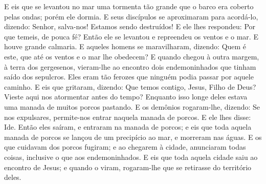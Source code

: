 {  E eis que se levantou no mar uma tormenta tão grande que o barco era coberto pelas ondas; porém ele dormia.
  E seus discípulos se aproximaram para acordá-lo, dizendo: Senhor, salva-nos! Estamos sendo destruídos!
  E ele lhes respondeu: Por que temeis,
{} de pouca fé? Então ele se levantou e repreendeu os ventos e o mar. E houve grande calmaria.
  E aqueles homens se maravilharam, dizendo: Quem é este, que até os ventos e o mar lhe obedecem?
  E quando chegou à outra margem, à terra dos gergesenos, vieram-lhe ao encontro dois endemoninhados que tinham saído dos sepulcros. Eles eram tão ferozes que ninguém podia passar por aquele caminho.
  E eis que gritaram, dizendo: Que temos contigo, Jesus, Filho de Deus? Vieste aqui nos atormentar antes do tempo?
  Enquanto isso longe deles estava uma manada de muitos porcos pastando.
  E os demônios rogaram-lhe, dizendo: Se nos expulsares, permite-nos entrar naquela manada de porcos.
  E ele lhes disse: Ide. Então eles saíram, e entraram na manada de porcos; e eis que toda aquela manada de porcos se lançou de um precipício ao mar, e morreram nas águas.
  E os que cuidavam dos porcos fugiram; e ao chegarem à cidade, anunciaram todas
{} coisas, inclusive o que
{} aos endemoninhados.
  E eis que toda aquela cidade saiu ao encontro de Jesus; e quando o viram, rogaram-lhe que se retirasse do território deles.
\par }

